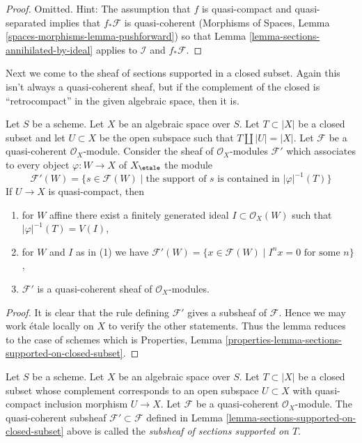 \begin{proof}
Omitted. Hint: The assumption that $f$ is quasi-compact and
quasi-separated implies that $f_*\mathcal{F}$ is quasi-coherent
(Morphisms of Spaces, Lemma \ref{spaces-morphisms-lemma-pushforward})
so that Lemma \ref{lemma-sections-annihilated-by-ideal} applies
to $\mathcal{I}$ and $f_*\mathcal{F}$.
\end{proof}

\noindent
Next we come to the sheaf of sections supported in a closed subset.
Again this isn't always a quasi-coherent sheaf, but if the complement
of the closed is ``retrocompact'' in the given algebraic space, then
it is.

\begin{lemma}
\label{lemma-sections-supported-on-closed-subset}
Let $S$ be a scheme. Let $X$ be an algebraic space over $S$.
Let $T \subset |X|$ be a closed subset and let $U \subset X$ be
the open subspace such that $T \amalg |U| = |X|$.
Let $\mathcal{F}$ be a quasi-coherent $\mathcal{O}_X$-module.
Consider the sheaf of $\mathcal{O}_X$-modules $\mathcal{F}'$
which associates to every object $\varphi : W \to X$ of
$X_\etale$ the module
$$
\mathcal{F}'(W)
=
\{s \in \mathcal{F}(W) \mid
\text{the support of }s\text{ is contained in }|\varphi|^{-1}(T)\}
$$
If $U \to X$ is quasi-compact, then
\begin{enumerate}
\item for $W$ affine there exist a finitely generated
ideal $I \subset \mathcal{O}_X(W)$ such that $|\varphi|^{-1}(T) = V(I)$,
\item for $W$ and $I$ as in (1) we have
$\mathcal{F}'(W) = \{x \in \mathcal{F}(W) \mid
I^nx = 0 \text{ for some } n\}$,
\item $\mathcal{F}'$ is a quasi-coherent sheaf of $\mathcal{O}_X$-modules.
\end{enumerate}
\end{lemma}

\begin{proof}
It is clear that the rule defining $\mathcal{F}'$ gives a subsheaf
of $\mathcal{F}$. Hence we may work \'etale locally on $X$ to verify
the other statements. Thus the lemma reduces to the case of schemes
which is
Properties, Lemma \ref{properties-lemma-sections-supported-on-closed-subset}.
\end{proof}

\begin{definition}
\label{definition-subsheaf-sections-supported-on-closed}
Let $S$ be a scheme. Let $X$ be an algebraic space over $S$.
Let $T \subset |X|$ be a closed subset whose complement
corresponds to an open subspace $U \subset X$
with quasi-compact inclusion morphism $U \to X$.
Let $\mathcal{F}$ be a quasi-coherent $\mathcal{O}_X$-module.
The quasi-coherent subsheaf $\mathcal{F}' \subset \mathcal{F}$ defined in
Lemma \ref{lemma-sections-supported-on-closed-subset} above is called
the {\it subsheaf of sections supported on $T$}.
\end{definition}

